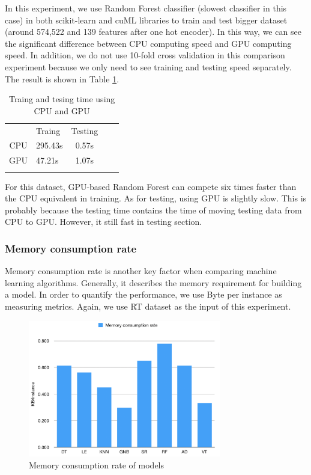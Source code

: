 In this experiment, we use Random Forest classifier (slowest classifier in this case) in both scikit-learn and cuML libraries to train and test bigger dataset (around 574,522 and 139 features after one hot encoder). In this way, we can see the significant difference between CPU computing speed and GPU computing speed. In addition, we do not use 10-fold cross validation in this comparison experiment because we only need to see training and testing speed separately. The result is shown in Table \ref{tab:gpu}.

\begin{table}[h]
\caption{Traing and tesing time using CPU and GPU}
\label{tab:gpu}       %
\begin{tabular}{clclc}
\hline\noalign{\smallskip}
 & Traing & Testing  \\
\noalign{\smallskip}\hline\noalign{\smallskip}
CPU & 295.43s & 0.57s \\
GPU & 47.21s & 1.07s \\
\noalign{\smallskip}\hline
\end{tabular}
\end{table}

For this dataset, GPU-based Random Forest can compete six times faster than the CPU equivalent in training. As for testing, using GPU is slightly slow. This is probably because the testing time contains the time of moving testing data from CPU to GPU. However, it still fast in testing section.

\subsubsection{Memory consumption rate}
Memory consumption rate is another key factor when comparing machine learning algorithms. Generally, it describes the memory requirement for building a model. In order to quantify the performance, we use Byte per instance as measuring metrics. Again, we use RT dataset as the input of this experiment.

\begin{figure}
  \includegraphics[width=0.75\textwidth]
  {memory.png}
\caption{Memory consumption rate of models}
\label{fig: memory consumption rate}       %
\end{figure}

